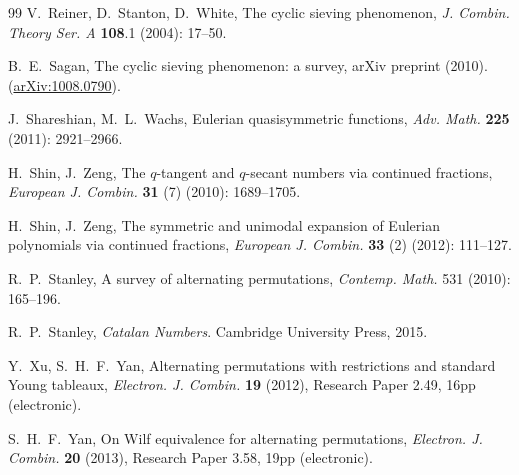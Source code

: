 \documentclass[12pt,reqno]{amsart}
\numberwithin{equation}{section}
\theoremstyle{plain}
\theoremstyle{definition}
\begin{document}
\begin{thebibliography}{99}
V.~Reiner, D.~Stanton, D.~White, The cyclic sieving phenomenon, \textit{J. Combin. Theory Ser. A} {\bf 108}.1 (2004): 17--50.

%

 B.~E.~Sagan, The cyclic sieving phenomenon: a survey, arXiv preprint (2010). (\href{http://arxiv.org/abs/1008.0790}{arXiv:1008.0790}).

 J.~Shareshian, M.~L.~Wachs, Eulerian quasisymmetric functions, \textit{Adv. Math.} {\bf 225} (2011): 2921--2966.

 H.~Shin, J.~Zeng, The $q$-tangent and $q$-secant numbers via continued fractions, \textit{European J. Combin.} {\bf 31} (7) (2010): 1689--1705.

 H.~Shin, J.~Zeng, The symmetric and unimodal expansion of Eulerian polynomials via continued fractions, \textit{European J. Combin.} {\bf 33} (2) (2012): 111--127.

 R.~P.~Stanley, A survey of alternating permutations, \textit{Contemp. Math.} 531 (2010): 165--196.

 R.~P.~Stanley, \textit{Catalan Numbers}. Cambridge University Press, 2015.

 Y.~Xu, S.~H.~F.~Yan, Alternating permutations with restrictions and standard Young tableaux, \textit{Electron. J. Combin.} {\bf 19} (2012), Research Paper 2.49, 16pp (electronic).

 S.~H.~F.~Yan, On Wilf equivalence for alternating permutations, \textit{Electron. J. Combin.} {\bf 20} (2013), Research Paper 3.58, 19pp (electronic).


\end{thebibliography}
\end{document}
